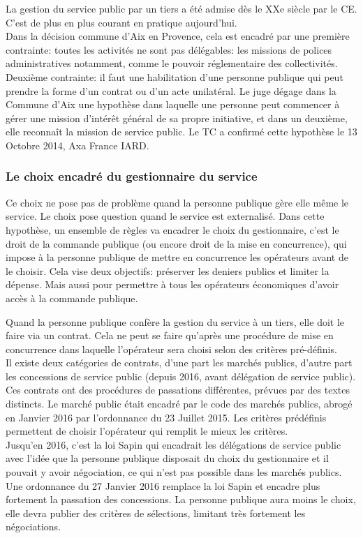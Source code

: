 \documentclass[10pt, a4paper, openany]{book}
\begin{document}
La gestion du service public par un tiers a été admise dès le XXe siècle par le CE. C'est de plus en plus courant en pratique aujourd'hui. \\
Dans la décision commune d'Aix en Provence, cela est encadré par une première contrainte: toutes les activités ne sont pas délégables: les missions de polices administratives notamment, comme le pouvoir réglementaire des collectivités. Deuxième contrainte: il faut une habilitation d'une personne publique qui peut prendre la forme d'un contrat ou d'un acte unilatéral. Le juge dégage dans la Commune d'Aix une hypothèse dans laquelle une personne peut commencer à gérer une mission d'intérêt général de sa propre initiative, et dans un deuxième, elle reconnaît la mission de service public. Le TC a confirmé cette hypothèse le 13 Octobre 2014, Axa France IARD. 

\subsubsection{Le choix encadré du gestionnaire du service}

Ce choix ne pose pas de problème quand la personne publique gère elle même le service. Le choix pose question quand le service est externalisé. Dans cette hypothèse, un ensemble de règles va encadrer le choix du gestionnaire, c'est le droit de la commande publique (ou encore droit de la mise en concurrence), qui impose à la personne publique de mettre en concurrence les opérateurs avant de le choisir. Cela vise deux objectifs: préserver les deniers publics et limiter la dépense. Mais aussi pour permettre à tous les opérateurs économiques d'avoir accès à la commande publique. 


Quand la personne publique confère la gestion du service à un tiers, elle doit le faire via un contrat. Cela ne peut se faire qu'après une procédure de mise en concurrence dans laquelle l'opérateur sera choisi selon des critères pré-définis. \\
Il existe deux catégories de contrats, d'une part les marchés publics, d'autre part les concessions de service public (depuis 2016, avant délégation de service public). Ces contrats ont des procédures de passations différentes, prévues par des textes distincts. Le marché public était encadré par le code des marchés publics, abrogé en Janvier 2016 par l'ordonnance du 23 Juillet 2015. Les critères prédéfinis permettent de choisir l'opérateur qui remplit le mieux les critères. \\
Jusqu'en 2016, c'est la loi Sapin qui encadrait les délégations de service public avec l'idée que la personne publique disposait du choix du gestionnaire et il pouvait y avoir négociation, ce qui n'est pas possible dans les marchés publics. Une ordonnance du 27 Janvier 2016 remplace la loi Sapin et encadre plus fortement la passation des concessions. La personne publique aura moins le choix, elle devra publier des critères de sélections, limitant très fortement les négociations. 
\end{document}

